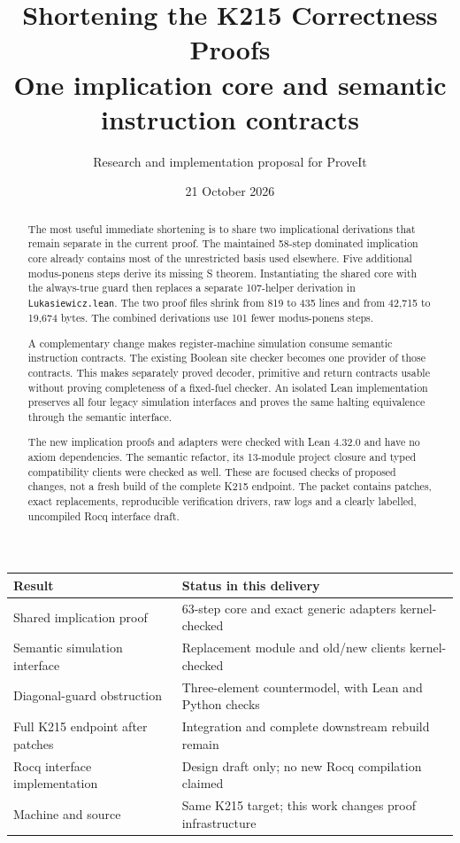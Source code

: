 \documentclass[11pt,letterpaper]{article}
\title{\color{ink}\bfseries Shortening the K215 Correctness Proofs\\[0.4em]
\large One implication core and semantic instruction contracts}
\author{Research and implementation proposal for ProveIt}
\date{21 October 2026}
\newcommand{\code}[1]{\texttt{#1}}
\begin{document}
\maketitle\thispagestyle{empty}
\begin{abstract}
The most useful immediate shortening is to share two implicational derivations
that remain separate in the current proof. The maintained 58-step dominated
implication core already contains most of the unrestricted basis used elsewhere.
Five additional modus-ponens steps derive its missing S theorem. Instantiating
the shared core with the always-true guard then replaces a separate 107-helper
derivation in \code{Lukasiewicz.lean}. The two proof files shrink from 819 to 435
lines and from 42,715 to 19,674 bytes. The combined derivations use 101 fewer
modus-ponens steps.

A complementary change makes register-machine simulation consume semantic
instruction contracts. The existing Boolean site checker becomes one provider
of those contracts. This makes separately proved decoder, primitive and return
contracts usable without proving completeness of a fixed-fuel checker.
An isolated Lean implementation preserves all four legacy simulation interfaces
and proves the same halting equivalence through the semantic interface.

The new implication proofs and adapters were checked with Lean 4.32.0 and have
no axiom dependencies. The semantic refactor, its 13-module project closure and
typed compatibility clients were checked as well. These are focused checks of
proposed changes, not a fresh build of the complete K215 endpoint. The packet
contains patches, exact replacements, reproducible verification drivers, raw logs
and a clearly labelled, uncompiled Rocq interface draft.
\end{abstract}
\begin{center}
\begin{tabular}{p{}p{}}
\toprule
Result & Status in this delivery\\
\midrule
Shared implication proof & 63-step core and exact generic adapters kernel-checked\\
Semantic simulation interface & Replacement module and old/new clients kernel-checked\\
Diagonal-guard obstruction & Three-element countermodel, with Lean and Python checks\\
Full K215 endpoint after patches & Integration and complete downstream rebuild remain\\
Rocq interface implementation & Design draft only; no new Rocq compilation claimed\\
Machine and source & Same K215 target; this work changes proof infrastructure\\
\bottomrule
\end{tabular}
\end{center}
\newpage\setcounter{tocdepth}{1}\tableofcontents\newpage
\end{document}
